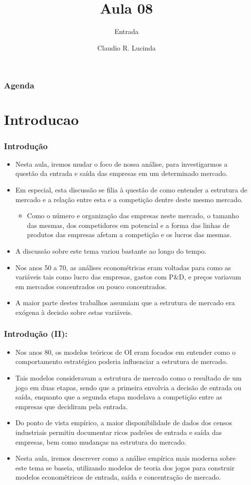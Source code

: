 \documentclass{beamer}
\title{Aula 08}
\subtitle{Entrada}
\author{Claudio R. Lucinda}
\institute{FEA/USP}
\date{}
\begin{document}
\frame{\titlepage}
\begin{frame}\frametitle{Agenda}
  \tableofcontents[pausesections]
\end{frame}
\section{Introducao}
\begin{frame}\frametitle{Introdução}
\small
\begin{itemize}
\item Nesta aula, iremos mudar o foco de nossa análise, para investigarmos
a questão da entrada e saída das empresas em um determinado mercado. 
\item Em especial, esta discussão se filia à questão de como entender a
estrutura de mercado e a relação entre esta e a competição dentre
deste mesmo mercado. 

\begin{itemize}
\item Como o número e organização das empresas neste mercado, o tamanho
das mesmas, dos competidores em potencial e a forma das linhas de
produtos das empresas afetam a competição e os lucros das mesmas. 
\end{itemize}
\item A discussão sobre este tema variou bastante ao longo do tempo. 
\item Nos anos 50 a 70, as análises econométricas eram voltadas para como
as variáveis tais como lucro das empresas, gastos com P\&D, e preços
variavam em mercados concentrados ou pouco concentrados. 
\item A maior parte destes trabalhos assumiam que a estrutura de mercado
era exógena à decisão sobre estas variáveis. 
\end{itemize}
\end{frame}

\begin{frame}\frametitle{Introdução (II):}
\small
\begin{itemize}
\item Nos anos 80, os modelos teóricos de OI eram focados em entender como
o comportamento estratégico poderia influenciar a estrutura de mercado. 
\item Tais modelos consideravam a estrutura de mercado como o resultado
de um jogo em duas etapas, sendo que a primeira envolvia a decisão
de entrada ou saída, enquanto que a segunda etapa modelava a competição
entre as empresas que decidiram pela entrada. 
\item Do ponto de vista empírico, a maior disponibilidade de dados dos censos
industriais permitiu documentar ricos padrões de entrada e saída das
empresas, bem como mudanças na estrutura do mercado. 
\item Nesta aula, iremos descrever como a análise empírica mais moderna
sobre este tema se baseia, utilizando modelos de teoria dos jogos
para construir modelos econométricos de entrada, saída e concentração
de mercado. 
\end{itemize}
\end{frame}
\end{document}
